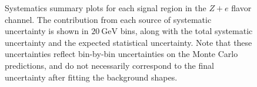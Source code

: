 \begin{figure}[p]
{	}
	\caption{Systematics summary plots for each signal region in the $Z+e$ flavor channel. The contribution from each source of systematic uncertainty is shown in $20~\mbox{GeV}$ bins, along with the total systematic uncertainty and the expected statistical uncertainty. Note that these uncertainties reflect bin-by-bin uncertainties on the Monte Carlo predictions, and do not necessarily correspond to the final uncertainty after fitting the background shapes.}
	\label{fig:systematics-summary-Ze}
\end{figure}

